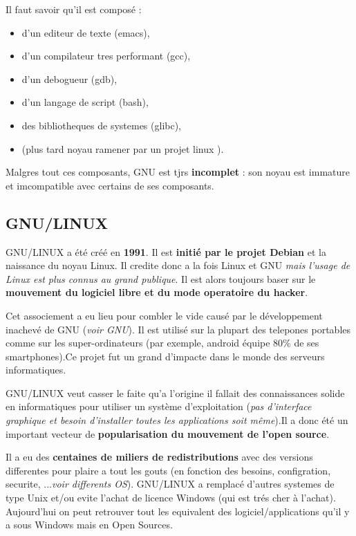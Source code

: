 Il faut savoir qu'il est composé : 
\begin{itemize}
	\item d'un editeur de texte (emacs),
	\item d'un compilateur tres performant (gcc),
	\item d'un debogueur (gdb), 
	\item d'un langage de script (bash),
	\item des bibliotheques de systemes (glibc),
	\item (plus tard noyau ramener par un projet linux ). 
\end{itemize}
Malgres tout ces composants, GNU est tjrs \textbf{incomplet} : son noyau est immature et imcompatible avec certains de ses composants. \newline



\subsection{GNU/LINUX}

GNU/LINUX a été créé en \textbf{1991}. Il est \textbf{initié par le projet Debian} et la naissance du noyau Linux. Il credite donc a la fois Linux et GNU \textit{mais l'usage de Linux est plus connus au grand publique}. Il est alors toujours baser sur le \textbf{mouvement du logiciel libre et du mode operatoire du hacker}. 

Cet associement a eu lieu pour combler le vide causé par le développement inachevé de GNU (\textit{voir GNU}). Il est utilisé sur la plupart des telepones portables comme sur les super-ordinateurs (par exemple, android équipe 80\% de ses smartphones).Ce projet fut un grand d'impacte dans le monde des serveurs informatiques.

GNU/LINUX veut casser le faite qu'a l'origine il fallait des connaissances solide en informatiques pour utiliser un système d'exploitation (\textit{pas d'interface graphique et besoin d'installer toutes les applications soit même}).Il a donc été un important vecteur de \textbf{popularisation du mouvement de l'open source}.

Il a eu des \textbf{centaines de miliers de redistributions} avec des versions differentes pour plaire a tout les gouts (en fonction des besoins, configration, securite, ...\textit{voir differents OS}). GNU/LINUX a remplacé d'autres systemes de type Unix et/ou evite l'achat de licence Windows (qui est trés cher à l'achat). Aujourd'hui on peut retrouver tout les equivalent des logiciel/applications qu'il y a sous Windows mais en Open Sources.\newline



